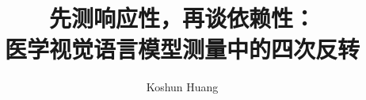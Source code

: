 \documentclass[UTF8,11pt]{ctexart}
\title{先测响应性，再谈依赖性：\\[2pt]
\large 医学视觉语言模型测量中的四次反转}
\author{Koshun Huang}
\date{}
\begin{document}
\maketitle

\begin{abstract}

\end{abstract}










\FloatBarrier



\appendix

\end{document}
